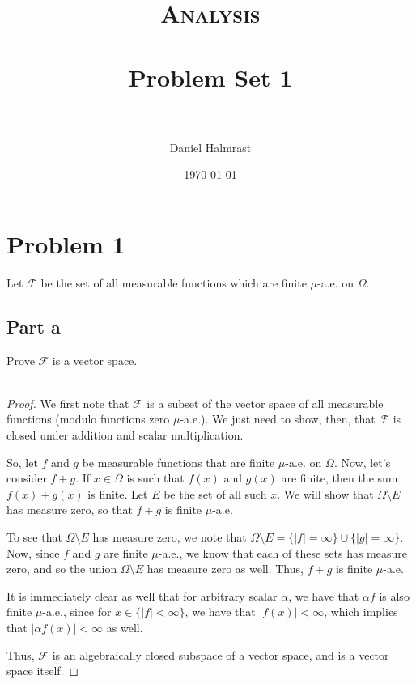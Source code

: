 \documentclass[fontsize=11pt]{scrartcl} %
\title{	
\normalfont \normalsize 
\textsc{Analysis} \\ [25pt] %
\horrule{0.5pt} \\[0.4cm] %
\huge Problem Set 1 \\ %
\horrule{2pt} \\[0.5cm] %
}
\author{Daniel Halmrast} %
\date{\normalsize\today} %
\numberwithin{equation}{section} %
\numberwithin{figure}{section} %
\numberwithin{table}{section} %
\begin{document}
\maketitle %


\section*{Problem 1}
Let $\mathscr{F}$ be the set of all measurable functions which are finite
$\mu$-a.e. on $\Omega$.

\subsection*{Part a}
Prove $\mathscr{F}$ is a vector space.
\\
\\
\begin{proof}
    We first note that $\mathscr{F}$ is a subset of the vector space of all
    measurable functions (modulo functions zero $\mu$-a.e.). We just need to
    show, then, that $\mathscr{F}$ is closed under addition and scalar
    multiplication.

    So, let $f$ and $g$ be measurable functions that are finite $\mu$-a.e. on
    $\Omega$. Now, let's consider $f+g$. If $x\in\Omega$ is such that $f(x)$ and
    $g(x)$ are finite, then the sum $f(x)+g(x)$ is finite. Let $E$ be the set of all
    such $x$. We will show that $\Omega\setminus E$ has measure zero, so that
    $f+g$ is finite $\mu$-a.e.

    To see that $\Omega\setminus E$ has measure zero, we note that
    $\Omega\setminus E =
    \{|f| = \infty\}\cup \{|g| = \infty\}$. Now, since $f$ and $g$ are finite
    $\mu$-a.e., we know that each of these sets has measure zero, and so the
    union $\Omega\setminus E$ has measure zero as well. Thus, $f+g$ is finite
    $\mu$-a.e.

    It is immediately clear as well that for arbitrary scalar $\alpha$, we have
    that $\alpha f$ is also finite $\mu$-a.e., since for $x\in \{|f|<\infty\}$,
    we have that $|f(x)|<\infty$, which implies that $|\alpha f(x)|<\infty$ as
    well.

    Thus, $\mathscr{F}$ is an algebraically closed subspace of a vector space,
    and is a vector space itself.
\end{proof}
\end{document}
